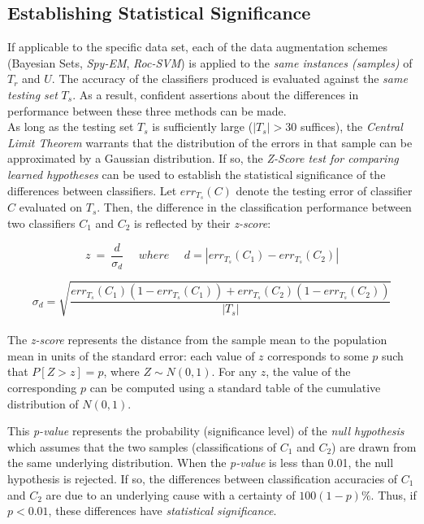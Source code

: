 \documentclass[12pt,twoside,notitlepage,amsart]{report} %
\begin{document}
	\subsection{Establishing Statistical Significance}
	
	If applicable to the specific data set, each of the data augmentation schemes (Bayesian Sets, \emph{Spy-EM}, \emph{Roc-SVM}) is applied to the \emph{same instances (samples)} of $T_r$ and $U$. The accuracy of the classifiers produced is evaluated against the \emph{same testing set} $T_s$. As a result, confident assertions about the differences in performance between these three methods can be made. \\
	
	As long as the testing set $T_s$ is sufficiently large ($|T_s| > 30$ suffices), the \emph{Central Limit Theorem} warrants that the distribution of the errors in that sample can be approximated by a Gaussian distribution. If so, the \emph{Z-Score test for comparing learned hypotheses} can be used to establish the statistical significance of the differences between classifiers. Let $err_{T_s}(C)$ denote the testing error of classifier $C$ evaluated on $T_s$. Then, the difference in the classification performance between two classifiers $C_1$ and $C_2$ is reflected by their \emph{z-score}: 
	
	\begin{equation*} \displaystyle \boxed{z ~=~ \frac{d}{\sigma_d}}~~~~~~where~~~~~~  d = | {err}_{T_s}(C_1) -  {err}_{T_s}(C_2)|  \end{equation*}
	
	\begin{equation}  \sigma_d = \sqrt{ \frac{{err}_{T_s}(C_1) (1 - {err}_{T_s}(C_1)) + {err}_{T_s}(C_2) (1 - {err}_{T_s}(C_2))}{|T_s|} } \end{equation}  \\
	
	
The \emph{z-score} represents the distance from the sample mean to the population mean in units of the standard error: each value of $z$ corresponds to some $p$ such that $P[Z > z] = p$, where $Z \sim N(0,1)$. For any $z$, the value of the corresponding $p$ can be computed using a standard table of the cumulative distribution of $N(0,1)$. 
	
	This \emph{p-value} represents the probability (significance level) of the \emph{null hypothesis} which assumes that the two samples (classifications of $C_1$ and $C_2$) are drawn from the same underlying distribution. When the \emph{p-value} is less than 0.01, the null hypothesis is rejected. If so, the differences between classification accuracies of $C_1$ and $C_2$ are due to an underlying cause with a certainty of $100(1-p) \%$. Thus, if $p<0.01$, these differences have \emph{statistical significance}. \\ 
	  	  
\end{document}
